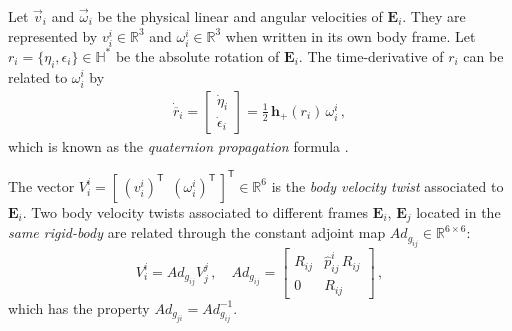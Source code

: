 Let $\vec{v}_{i}$ and $\vec{\omega}_{i}$ be the physical linear and angular velocities of $\mathbf{E}_{i}$. They are represented by 
$v^{i}_{i}\in\mathbb{R}^{3}$ and $\omega^{i}_{i}\in\mathbb{R}^{3}$ when written in its own body frame.
%
Let $r_i = \{\eta_i,\epsilon_i\}\in\mathbb{H}^*$ be the absolute rotation of $\mathbf{E}_i$. 
The time-derivative of $r_i$ can be related to $\omega^i_{i}$ by
%
\begin{align}
\dot{\overline{r}}_i = 
%
\left[ \begin{array}{cc}
\dot{\eta}_i \\
\dot{\epsilon}_i 
\end{array} \right] = 
%
\frac{1}{2} \, \mathbf{h}_+(r_i) \, \omega^i_{i} \,, 
\label{eq:quaternion_propagation}
\end{align}
%
which is known as the \textit{quaternion propagation} formula \cite{adorno2017}.

The vector $V^{i}_{i} = [\, (v^{i}_{i})^\mathsf{T} \,\,\, (\omega^{i}_{i})^\mathsf{T} \,]^\mathsf{T} \in \mathbb{R}^{6}$ is the \textit{body velocity twist} associated to $\mathbf{E}_{i}$.
%
Two body velocity twists associated to different frames $\mathbf{E}_i$, $\mathbf{E}_j$ located in the \textit{same rigid-body} are related through the constant adjoint map 
$Ad_{g_{ij}} \in \mathbb{R}^{6 \times 6}$:
%
\begin{equation}
V^{i}_{i} = Ad_{g_{ij}} V^{j}_{j} \,, \quad
%
Ad_{g_{ij}} =
\left[\begin{array}{cc}
R_{ij} & \hat{p}^{i}_{ij} \, R_{ij} \\
  0    &             R_{ij}
\end{array}\right] \,,
\label{eq:adjoint_map}
\end{equation}
%
which has the property $Ad_{g_{ji}} = Ad^{-1}_{g_{ij}}$.

